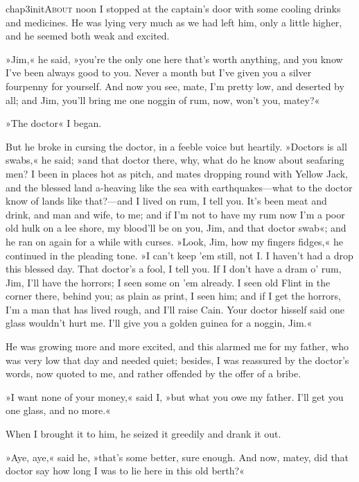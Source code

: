 
\lettrine[lines=5,image=true,findent=2pt]{chap3initA}{bout} noon I stopped at the captain's door with some cooling drinks and medicines. He was lying very much as we had left him, only a little higher, and he seemed both weak and excited.

\zz
»Jim,« he said, »you're the only one here that's worth anything, and you know I've been always good to you. Never a month but I've given you a silver fourpenny for yourself. And now you see, mate, I'm pretty low, and deserted by all; and Jim, you'll bring me one noggin of rum, now, won't you, matey?«

»The doctor\longdash« I began.

But he broke in cursing the doctor, in a feeble voice but heartily. »Doctors is all swabs,« he said; »and that doctor there, why, what do he know about seafaring men? I been in places hot as pitch, and mates dropping round with Yellow Jack, and the blessed land a-heaving like the sea with earthquakes—what to the doctor know of lands like that?—and I lived on rum, I tell you. It's been meat and drink, and man and wife, to me; and if I'm not to have my rum now I'm a poor old hulk on a lee shore, my blood'll be on you, Jim, and that doctor swab«; and he ran on again for a while with curses. »Look, Jim, how my fingers fidges,« he continued in the pleading tone. »I can't keep 'em still, not I. I haven't had a drop this blessed day. That doctor's a fool, I tell you. If I don't have a dram o' rum, Jim, I'll have the horrors; I seen some on 'em already. I seen old Flint in the corner there, behind you; as plain as print, I seen him; and if I get the horrors, I'm a man that has lived rough, and I'll raise Cain. Your doctor hisself said one glass wouldn't hurt me. I'll give you a golden guinea for a noggin, Jim.«

He was growing more and more excited, and this alarmed me for my father, who was very low that day and needed quiet; besides, I was reassured by the doctor's words, now quoted to me, and rather offended by the offer of a bribe.

»I want none of your money,« said I, »but what you owe my father. I'll get you one glass, and no more.«

When I brought it to him, he seized it greedily and drank it out.

»Aye, aye,« said he, »that's some better, sure enough. And now, matey, did that doctor say how long I was to lie here in this old berth?«

